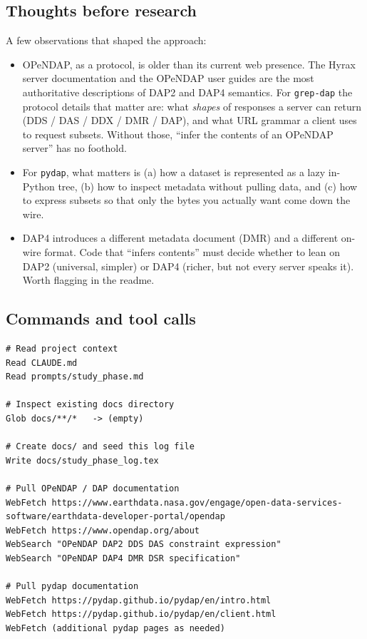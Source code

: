 \documentclass[11pt]{article}
\begin{document}
\subsection*{Thoughts before research}

A few observations that shaped the approach:

\begin{itemize}
  \item OPeNDAP, as a protocol, is older than its current web
    presence. The Hyrax server documentation and the OPeNDAP user
    guides are the most authoritative descriptions of DAP2 and DAP4
    semantics. For \texttt{grep-dap} the protocol details that
    matter are: what \emph{shapes} of responses a server can return
    (DDS / DAS / DDX / DMR / DAP), and what URL grammar a client
    uses to request subsets. Without those, ``infer the contents of
    an OPeNDAP server'' has no foothold.
  \item For \texttt{pydap}, what matters is (a) how a dataset is
    represented as a lazy in-Python tree, (b) how to inspect
    metadata without pulling data, and (c) how to express subsets
    so that only the bytes you actually want come down the wire.
  \item DAP4 introduces a different metadata document (DMR) and a
    different on-wire format. Code that ``infers contents'' must
    decide whether to lean on DAP2 (universal, simpler) or DAP4
    (richer, but not every server speaks it). Worth flagging in the
    readme.
\end{itemize}

\subsection*{Commands and tool calls}

\begin{lstlisting}
# Read project context
Read CLAUDE.md
Read prompts/study_phase.md

# Inspect existing docs directory
Glob docs/**/*   -> (empty)

# Create docs/ and seed this log file
Write docs/study_phase_log.tex

# Pull OPeNDAP / DAP documentation
WebFetch https://www.earthdata.nasa.gov/engage/open-data-services-software/earthdata-developer-portal/opendap
WebFetch https://www.opendap.org/about
WebSearch "OPeNDAP DAP2 DDS DAS constraint expression"
WebSearch "OPeNDAP DAP4 DMR DSR specification"

# Pull pydap documentation
WebFetch https://pydap.github.io/pydap/en/intro.html
WebFetch https://pydap.github.io/pydap/en/client.html
WebFetch (additional pydap pages as needed)
\end{lstlisting}
\end{document}
